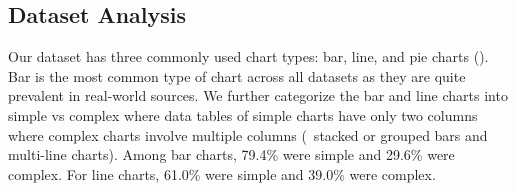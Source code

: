 \begin{table}[t!]
\centering
\small 
{}
\caption{\small Distribution of  questions types of among 300 randomly chosen human written questions (blue-colored tokens make visual references to the chart).
}
\label{dataset-content}
\end{table}


\subsection{Dataset Analysis}   








Our dataset has three commonly used chart types: bar, line, and pie charts (). Bar is the most common type of chart across all datasets as they are quite prevalent in real-world sources. We further categorize the bar and line charts into simple vs complex where  data tables of simple charts have only two columns where complex charts involve multiple columns (\eg\ stacked or grouped bars and multi-line charts).
Among bar charts, 79.4\% were simple and 29.6\% were complex. For line charts, 61.0\% were simple and 39.0\% were complex. 









